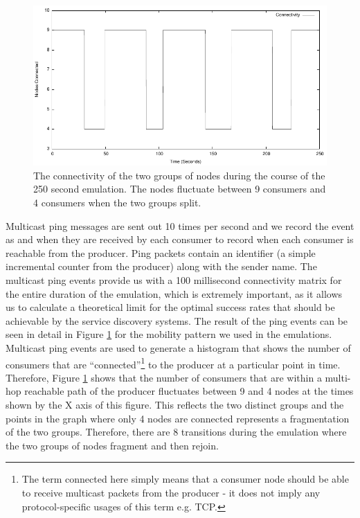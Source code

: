 \begin{figure}
\centering
\includegraphics[scale=1.0]{indi10ping-distribution.pdf}
\caption{The connectivity of the two groups of nodes during the course of the 250 second emulation.  The nodes fluctuate between 9
consumers and 4 consumers when the two groups split.} 
\label{indi:fig:emulationconnectivity}
\end{figure}

Multicast ping messages are sent out 10 times per second and we record the event as and when they are received by each consumer to record when each consumer is reachable from the producer.  Ping packets contain an identifier (a simple incremental counter from the producer) along with the sender name. The multicast ping events provide us with a 100 millisecond connectivity matrix for the entire duration of the emulation, which is extremely important, as it allows us to calculate a theoretical limit for the optimal success rates that should be achievable by the service discovery systems.  The result of the ping events can be seen in detail in Figure \ref{indi:fig:emulationconnectivity} for the mobility pattern we used in the emulations.  Multicast ping events are used to generate a histogram that shows the number of consumers that are ``connected''\footnote{The term connected here simply means that a consumer node should be able to receive multicast packets from the producer - it does not imply any protocol-specific usages of this term e.g. TCP.} to the producer at a particular point in time. Therefore, Figure \ref{indi:fig:emulationconnectivity} shows that the number of consumers that are within a multi-hop reachable path of the producer fluctuates between 9 and 4 nodes at the times shown by the X axis of this figure.   This reflects the two distinct groups and the points in the graph where only 4 nodes are connected represents a fragmentation of the two groups.  Therefore, there are 8 transitions during the emulation where the two groups of nodes fragment and then rejoin.   


